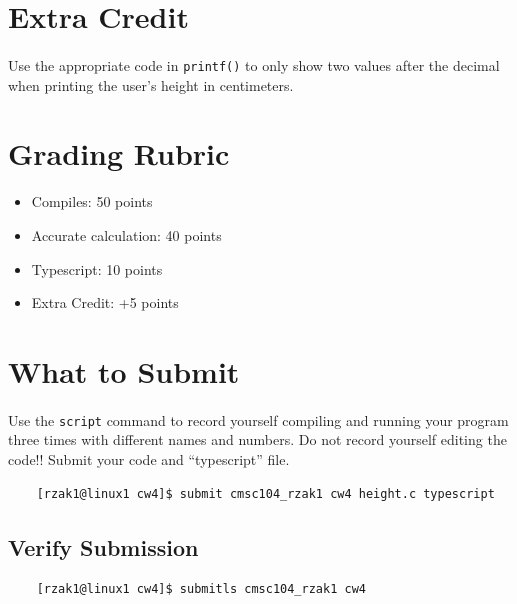 \documentclass[letter,11pt]{article}
\begin{document}
\section*{Extra Credit}
\paragraph{}Use the appropriate code in \texttt{printf()} to only show two values after the decimal when printing the user's height in centimeters.

\section*{Grading Rubric}
\begin{itemize}
    \item Compiles: 50 points
    \item Accurate calculation: 40 points
    \item Typescript: 10 points
    \item Extra Credit: +5 points
\end{itemize}

\section*{What to Submit}
\paragraph{}Use the \texttt{script} command to record yourself compiling and running your program three times with different names and numbers. Do not record yourself editing the code!! Submit your code and ``typescript'' file.
\begin{verbatim}
    [rzak1@linux1 cw4]$ submit cmsc104_rzak1 cw4 height.c typescript
\end{verbatim}

\subsection*{Verify Submission}
\begin{verbatim}
    [rzak1@linux1 cw4]$ submitls cmsc104_rzak1 cw4
\end{verbatim}
\end{document}
